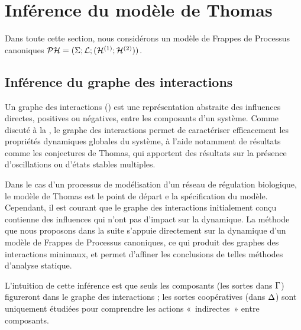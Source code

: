 
\section{Inférence du modèle de Thomas}

\TODO



Dans toute cette section, nous considérons un modèle de Frappes de Processus canoniques
$\mathcal{PH} = (\Sigma; \mathcal{L}; (\mathcal{H}^{(1)}; \mathcal{H}^{(2)}))$.

\subsection{Inférence du graphe des interactions}

Un graphe des interactions () est une représentation abstraite des
influences directes, positives ou négatives, entre les composants d'un système.
Comme discuté à la , le graphe des interactions permet
de caractériser efficacement les propriétés dynamiques globales du système,
à l'aide notamment de résultats comme les conjectures de Thomas,
qui apportent des résultats sur la présence d'oscillations ou d'états stables multiples.

Dans le cas d'un processus de modélisation d'un réseau de régulation biologique, le modèle
de Thomas est le point de départ e la spécification du modèle.
Cependant, il est courant que le graphe des interactions initialement conçu contienne des
influences qui n'ont pas d'impact sur la dynamique.
La méthode que nous proposons dans la suite s'appuie directement sur la dynamique d'un modèle
de Frappes de Processus canoniques, ce qui produit des graphes des interactions minimaux,
et permet d'affiner les conclusions de telles méthodes d'analyse statique.

L'intuition de cette inférence est que seuls les composants (les sortes dans $\mathrm{\Gamma}$)
figureront dans le graphe des interactions ;
les sortes coopératives (dans $\Delta$) sont uniquement étudiées pour comprendre les actions
«~indirectes~» entre composants.



